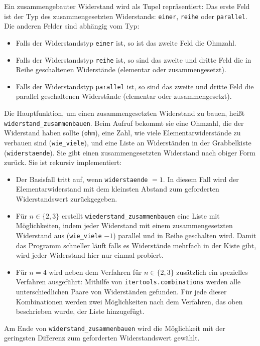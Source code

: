\documentclass[a4paper,10pt,ngerman]{scrartcl}
\begin{document}
Ein zusammengebauter Widerstand wird als Tupel repräsentiert: Das erste Feld ist der Typ des zusammengesetzten Widerstands: \texttt{einer}, \texttt{reihe} oder \texttt{parallel}. Die anderen Felder sind abhängig vom Typ:
\begin{itemize}
  \item Falls der Widerstandstyp \texttt{einer} ist, so ist das zweite Feld die Ohmzahl.
  \item Falls der Widerstandstyp \texttt{reihe} ist, so sind das zweite und dritte Feld die in Reihe geschaltenen Widerstände (elementar oder zusammengesetzt).
  \item Falls der Widerstandstyp \texttt{parallel} ist, so sind das zweite und dritte Feld die parallel geschaltenen Widerstände (elementar oder zusammengesetzt).
\end{itemize}

Die Hauptfunktion, um einen zusammengesetzten Widerstand zu bauen, heißt \texttt{widerstand\_zusammenbauen}. Beim Aufruf bekommt sie eine Ohmzahl, die der Widerstand haben sollte (\texttt{ohm}), eine Zahl, wie viele Elementarwiderstände zu verbauen sind (\texttt{wie\_viele}), und eine Liste an Widerständen in der Grabbelkiste (\texttt{widerstaende}). Sie gibt einen zusammengesetzten Widerstand nach obiger Form zurück. Sie ist rekursiv implementiert: 
\begin{itemize}
  \item Der Basisfall tritt auf, wenn \texttt{widerstaende} $ = 1$. In diesem Fall wird der Elementarwiderstand mit dem kleinsten Abstand zum geforderten Widerstandswert zurückgegeben.
  \item Für $n \in \{2,3\}$ erstellt \texttt{wiederstand\_zusammenbauen} eine Liste mit Möglichkeiten, indem jeder Widerstand mit einem zusammengesetzten Widerstand aus (\texttt{wie\_viele} $-1$) parallel und in Reihe geschalten wird. Damit das Programm schneller läuft falls es Widerstände mehrfach in der Kiste gibt, wird jeder Widerstand hier nur einmal probiert.
  \item Für $n=4$ wird neben dem Verfahren für $n \in \{2,3\}$ zusätzlich ein spezielles Verfahren ausgeführt: Mithilfe von \texttt{itertools.combinations} werden alle unterschiedlichen Paare von Widerständen gefunden. Für jede dieser Kombinationen werden zwei Möglichkeiten nach dem Verfahren, das oben beschrieben wurde, der Liste hinzugefügt.
\end{itemize}
Am Ende von \texttt{widerstand\_zusammenbauen} wird die Möglichkeit mit der geringsten Differenz zum geforderten Widerstandswert gewählt.
\end{document}
